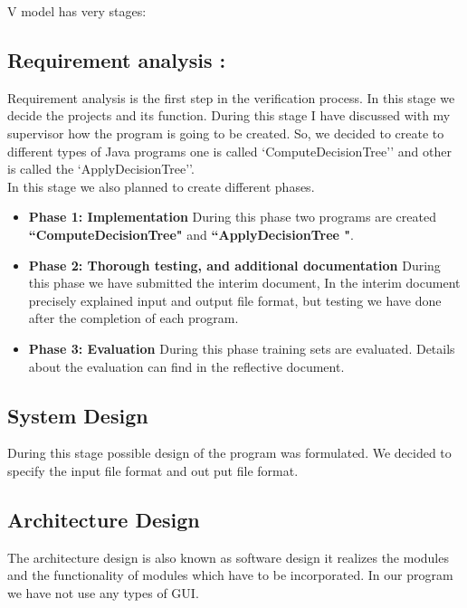 \documentclass{article}
\begin{document}
V model has very stages:

\subsection{Requirement analysis :}

Requirement analysis is the first step in the verification process. In this stage we decide the projects and its function. During this stage I have discussed with my supervisor how the program is going to be created. So, we decided to create to different types of Java programs one is called `ComputeDecisionTree'' and other is called the `ApplyDecisionTree''. \\
In this stage we also planned to create different phases.

\begin{itemize}

\item {\bf Phase 1: Implementation} During this phase two programs are created {\bf ``ComputeDecisionTree"} and {\bf ``ApplyDecisionTree "}.

\item {\bf Phase 2: Thorough testing, and additional documentation}
During this phase we have submitted the interim document, In the interim document precisely explained input and output file format, but testing we have done after the completion of each program.

\item {\bf Phase 3: Evaluation} During this phase training sets are evaluated. Details about the evaluation can find in the reflective document. 


\end{itemize}

\subsection{System Design}

During this stage possible design of the program was formulated. We decided to specify the input file format and out put file format. 

\subsection{Architecture Design}

The architecture design is also known as software design it realizes the modules and the functionality of modules which have to be incorporated. In our program we have not use any types of GUI.
 
\end{document}
